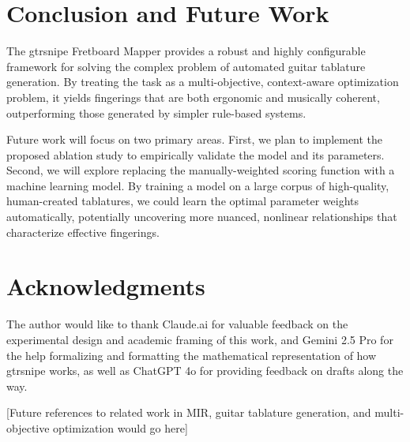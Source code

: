 \documentclass[conference]{IEEEtran}
\begin{document}
\section{Conclusion and Future Work}

The gtrsnipe Fretboard Mapper provides a robust and highly configurable framework for solving the complex problem of automated guitar tablature generation. By treating the task as a multi-objective, context-aware optimization problem, it yields fingerings that are both ergonomic and musically coherent, outperforming those generated by simpler rule-based systems.

Future work will focus on two primary areas. First, we plan to implement the proposed ablation study to empirically validate the model and its parameters. Second, we will explore replacing the manually-weighted scoring function with a machine learning model. By training a model on a large corpus of high-quality, human-created tablatures, we could learn the optimal parameter weights automatically, potentially uncovering more nuanced, nonlinear relationships that characterize effective fingerings.

\section*{Acknowledgments}
The author would like to thank Claude.ai for valuable feedback on the experimental design and academic framing of this work, and Gemini 2.5 Pro for the help formalizing and formatting the mathematical representation of how gtrsnipe works, as well as ChatGPT 4o for providing feedback on drafts along the way.

\begin{thebibliography}{1}

[Future references to related work in MIR, guitar tablature generation, and multi-objective optimization would go here]

\end{thebibliography}
\end{document}
